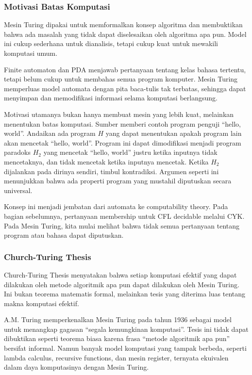 \subsubsection{Motivasi Batas Komputasi}

\begin{jawab}
Mesin Turing dipakai untuk memformalkan konsep algoritma dan membuktikan bahwa ada masalah yang tidak dapat diselesaikan oleh algoritma apa pun. Model ini cukup sederhana untuk dianalisis, tetapi cukup kuat untuk mewakili komputasi umum.
\end{jawab}

Finite automaton dan PDA menjawab pertanyaan tentang kelas bahasa tertentu, tetapi belum cukup untuk membahas semua program komputer. Mesin Turing memperluas model automata dengan pita baca-tulis tak terbatas, sehingga dapat menyimpan dan memodifikasi informasi selama komputasi berlangsung.

Motivasi utamanya bukan hanya membuat mesin yang lebih kuat, melainkan menentukan batas komputasi. Sumber memberi contoh program penguji ``hello, world''. Andaikan ada program $H$ yang dapat menentukan apakah program lain akan mencetak ``hello, world''. Program ini dapat dimodifikasi menjadi program paradoks $H_2$ yang mencetak ``hello, world'' justru ketika inputnya tidak mencetaknya, dan tidak mencetak ketika inputnya mencetak. Ketika $H_2$ dijalankan pada dirinya sendiri, timbul kontradiksi. Argumen seperti ini menunjukkan bahwa ada properti program yang mustahil diputuskan secara universal.

Konsep ini menjadi jembatan dari automata ke computability theory. Pada bagian sebelumnya, pertanyaan membership untuk CFL decidable melalui CYK. Pada Mesin Turing, kita mulai melihat bahwa tidak semua pertanyaan tentang program atau bahasa dapat diputuskan.

\subsubsection{Church-Turing Thesis}

\begin{jawab}
Church-Turing Thesis menyatakan bahwa setiap komputasi efektif yang dapat dilakukan oleh metode algoritmik apa pun dapat dilakukan oleh Mesin Turing. Ini bukan teorema matematis formal, melainkan tesis yang diterima luas tentang makna komputasi efektif.
\end{jawab}

A.M. Turing memperkenalkan Mesin Turing pada tahun 1936 sebagai model untuk menangkap gagasan ``segala kemungkinan komputasi''. Tesis ini tidak dapat dibuktikan seperti teorema biasa karena frasa ``metode algoritmik apa pun'' bersifat informal. Namun banyak model komputasi yang tampak berbeda, seperti lambda calculus, recursive functions, dan mesin register, ternyata ekuivalen dalam daya komputasinya dengan Mesin Turing.

